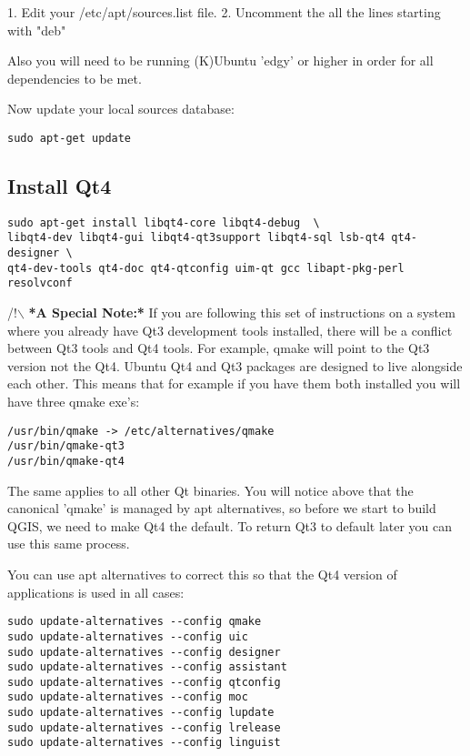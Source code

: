 1. Edit your /etc/apt/sources.list file.  
2. Uncomment the all the lines starting with "deb"

Also you will need to be running (K)Ubuntu 'edgy' or higher in order for 
all dependencies to be met.

Now update your local sources database:

\begin{verbatim}
sudo apt-get update 
\end{verbatim}

\subsection{Install Qt4}
\begin{verbatim}
sudo apt-get install libqt4-core libqt4-debug  \
libqt4-dev libqt4-gui libqt4-qt3support libqt4-sql lsb-qt4 qt4-designer \
qt4-dev-tools qt4-doc qt4-qtconfig uim-qt gcc libapt-pkg-perl resolvconf
\end{verbatim}

/!$\backslash$ \textbf{*A Special Note:*} If you are following this set of instructions on
a system where you already have Qt3 development tools installed, there will
be a conflict between Qt3 tools and Qt4 tools. For example, qmake will
point to the Qt3 version not the Qt4. Ubuntu Qt4 and Qt3 packages are
designed to live alongside each other. This means that for example if you
have them both installed you will have three qmake exe's:

\begin{verbatim}
/usr/bin/qmake -> /etc/alternatives/qmake 
/usr/bin/qmake-qt3
/usr/bin/qmake-qt4 
\end{verbatim}

The same applies to all other Qt binaries. You will notice above that the
canonical 'qmake' is managed by apt alternatives, so before we start to
build QGIS, we need to make Qt4 the default. To return Qt3 to default later
you can use this same process.

You can use apt alternatives to correct this so that the Qt4 version of
applications is used in all cases:

\begin{verbatim}
sudo update-alternatives --config qmake
sudo update-alternatives --config uic 
sudo update-alternatives --config designer 
sudo update-alternatives --config assistant 
sudo update-alternatives --config qtconfig 
sudo update-alternatives --config moc 
sudo update-alternatives --config lupdate 
sudo update-alternatives --config lrelease 
sudo update-alternatives --config linguist 
\end{verbatim}

